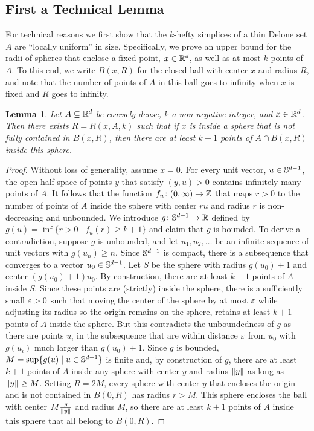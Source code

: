 \documentclass[10pt,a4paper]{article}
\newtheorem{lemma}{Lemma}[section]
\newcommand {\mm}[1] {\ifmmode{#1}\else{\mbox{\(#1\)}}\fi}
\theoremstyle{plain}
\newcommand{\Rspace}        {\mm{{\mathbb R}}}
\newcommand{\Sspace}        {\mm{{\mathbb S}}}
\newcommand{\Zspace}        {\mm{{\mathbb Z}}}
\newcommand{\norm}[1]       {\mm{\|{#1}\|}}
\newcommand{\ee}            {\mm{\varepsilon}}
\begin{document}
\subsection{First a Technical Lemma}
\label{sec:2.1}
For technical reasons we first show that the $k$-hefty simplices of a thin Delone set $A$ are ``locally uniform'' in size.
Specifically, we prove an upper bound for the radii of spheres that enclose a fixed point, $x \in \Rspace^d$, as well as at most $k$ points of $A$.
To this end, we write $B(x,R)$ for the closed ball with center $x$ and radius $R$, and note that the number of points of $A$ in this ball goes to infinity when $x$ is fixed and $R$ goes to infinity.
\begin{lemma}
  \label{lem:hefty_simplices_have_bounded_radius}
  Let $A \subseteq \Rspace^d$ be coarsely dense, $k$ a non-negative integer, and $x \in \Rspace^d$.
  Then there exists $R = R(x,A,k)$ such that if $x$ is inside a sphere that is not fully contained in $B(x,R)$, then there are at least $k+1$ points of $A \cap B(x,R)$ inside this sphere.
\end{lemma}
\begin{proof}
  Without loss of generality, assume $x=0$. 
  For every unit vector, $u \in \Sspace^{d-1}$, the open half-space of points $y$ that satisfy $(y,u)>0$ contains infinitely many points of $A$. 
  It follows that the function $f_u \colon (0,\infty) \to \Zspace$ that maps $r > 0$ to the number of points of $A$ inside the sphere with center $ru$ and radius $r$ is non-decreasing and unbounded. 
  \smallskip
  We introduce $g \colon \Sspace^{d-1} \to \Rspace$ defined by $g(u) = \inf \{r > 0 \mid f_u(r)\geq k+1\}$ and claim that $g$ is bounded.
  To derive a contradiction, suppose $g$ is unbounded, and let $u_1, u_2, \ldots$ be an infinite sequence of unit vectors with $g(u_n) \geq n$.
  Since $\Sspace^{d-1}$ is compact, there is a subsequence that converges to a vector $u_0 \in \Sspace^{d-1}$.
  Let $S$ be the sphere with radius $g(u_0)+1$ and center $(g(u_0)+1) u_0$. 
  By construction, there are at least $k+1$ points of $A$ inside $S$.
  Since these points are (strictly) inside the sphere, there is a sufficiently small $\ee > 0$ such that moving the center of the sphere by at most $\ee$ while adjusting its radius so the origin remains on the sphere, retains at least $k+1$ points of $A$ inside the sphere.
  But this contradicts the unboundedness of $g$ as there are points $u_i$ in the subsequence that are within distance $\ee$ from $u_0$ with $g(u_i)$ much larger than $g(u_0)+1$.
  \smallskip
  Since $g$ is bounded, $M = \sup \{g(u) \mid u \in \Sspace^{d-1}\}$ is finite and, by construction of $g$, there are at least $k+1$ points of $A$ inside any sphere with center $y$ and radius $\norm{y}$ as long as $\norm{y} \geq M$.
  Setting $R = 2M$, every sphere with center $y$ that encloses the origin and is not contained in $B(0,R)$ has radius $r > M$.
  This sphere encloses the ball with center $M \frac{y}{\norm{y}}$ and radius $M$, so there are at least $k+1$ points of $A$ inside this sphere that all belong to $B(0,R)$.
\end{proof}
\end{document}
